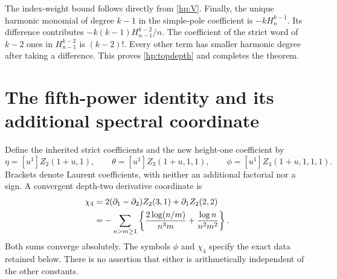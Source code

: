 \documentclass[11pt]{article}
\numberwithin{equation}{section}
\theoremstyle{plain}
\theoremstyle{definition}
\theoremstyle{remark}
\begin{document}
The index-weight bound follows directly from \eqref{hp:V}. Finally,
the unique harmonic monomial of degree $k-1$ in the simple-pole
coefficient is $-kH_n^{k-1}$. Its difference contributes
$-k(k-1)H_{n-1}^{k-2}/n$. The coefficient of the strict word of
$k-2$ ones in $H_{n-1}^{k-2}$ is $(k-2)!$.
Every other term has smaller harmonic degree after taking a
difference. This proves \eqref{hp:topdepth} and completes the theorem.

\section{The fifth-power identity and its additional spectral coordinate}
\label{hp:sec:fifth}

Define the inherited strict coefficients and the new height-one
coefficient by
\begin{equation}\label{hp:heightcoeffs}
 \eta=[u^1]Z_2(1+u,1),\qquad
 \theta=[u^1]Z_3(1+u,1,1),\qquad
 \phi=[u^1]Z_4(1+u,1,1,1).
\end{equation}
Brackets denote Laurent coefficients, with neither an additional
factorial nor a sign. A convergent depth-two derivative coordinate is
\begin{align}
 \chi_4&=2(\partial_1-\partial_2)Z_2(3,1)
                         +\partial_1Z_2(2,2)\label{hp:chi}\\
 &=-\sum_{n>m\ge1}\left\{
       \frac{2\log(n/m)}{n^3m}+\frac{\log n}{n^2m^2}\right\}.
       \notag
\end{align}
Both sums converge absolutely. The symbols $\phi$ and $\chi_4$ specify
the exact data retained below. There is no assertion that either is
arithmetically independent of the other constants.
\end{document}
